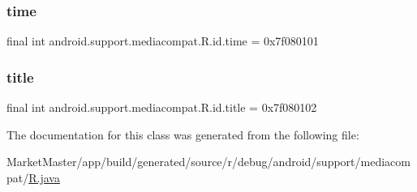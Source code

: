 \subsubsection{\texorpdfstring{time}{time}}
{\footnotesize\ttfamily final int android.\+support.\+mediacompat.\+R.\+id.\+time = 0x7f080101\hspace{0.3cm}{\ttfamily [static]}}

\mbox{\label{classandroid_1_1support_1_1mediacompat_1_1R_1_1id_a6040b8dfeb6da7cd9778754e38ed9bb3}} 
\subsubsection{\texorpdfstring{title}{title}}
{\footnotesize\ttfamily final int android.\+support.\+mediacompat.\+R.\+id.\+title = 0x7f080102\hspace{0.3cm}{\ttfamily [static]}}



The documentation for this class was generated from the following file\+:\begin{DoxyCompactItemize}
\item 
Market\+Master/app/build/generated/source/r/debug/android/support/mediacompat/\mbox{\hyperlink{debug_2android_2support_2mediacompat_2R_8java}{R.\+java}}\end{DoxyCompactItemize}

